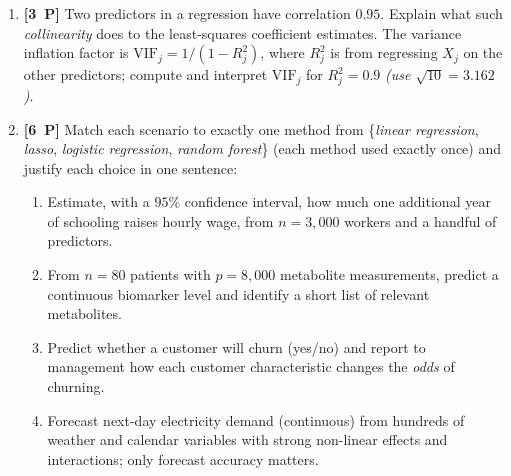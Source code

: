 \documentclass[11pt,a4paper]{article}
\newcommand{\pp}[1]{\textbf{[#1~P]}\enspace}
\begin{document}
\begin{enumerate}[label=(\alph*),leftmargin=7mm,itemsep=2.5mm]
    lasso and what it inherits from ridge regression. In which situation does the elastic net
    clearly outperform the lasso?
  \item \pp{3} Two predictors in a regression have correlation $0.95$. Explain what such
    \emph{collinearity} does to the least-squares coefficient estimates. The variance inflation
    factor is $\mathrm{VIF}_j=1/(1-R_j^2)$, where $R_j^2$ is from regressing $X_j$ on the other
    predictors; compute and interpret $\mathrm{VIF}_j$ for $R_j^2=0.9$ \emph{(use
    $\sqrt{10}=3.162$)}.
  \item \pp{6} Match each scenario to exactly one method from
    \{\emph{linear regression}, \emph{lasso}, \emph{logistic regression},
    \emph{random forest}\} (each method used exactly once) and justify each choice in one
    sentence:
    \begin{enumerate}[label=(\roman*),nosep,topsep=1mm]
      \item Estimate, with a $95\%$ confidence interval, how much one additional year of
        schooling raises hourly wage, from $n=3{,}000$ workers and a handful of predictors.
      \item From $n=80$ patients with $p=8{,}000$ metabolite measurements, predict a continuous
        biomarker level and identify a short list of relevant metabolites.
      \item Predict whether a customer will churn (yes/no) and report to management how each
        customer characteristic changes the \emph{odds} of churning.
      \item Forecast next-day electricity demand (continuous) from hundreds of weather and
        calendar variables with strong non-linear effects and interactions; only forecast
        accuracy matters.
    \end{enumerate}
\end{enumerate}
\end{document}
